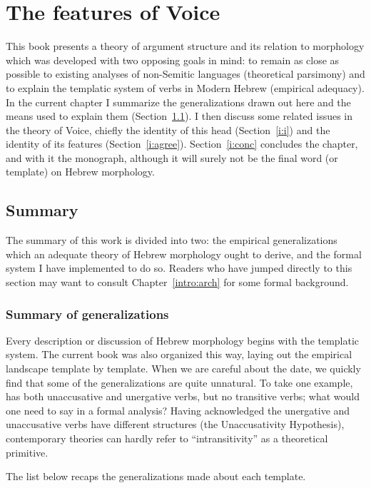 \chapter{The features of Voice}
\label{chap:i}

This book presents a theory of argument structure and its relation to morphology which was developed with two opposing goals in mind: to remain as close as possible to existing analyses of non-Semitic languages (theoretical parsimony) and to explain the templatic system of verbs in Modern Hebrew (empirical adequacy). In the current chapter I summarize the generalizations drawn out here and the means used to explain them (Section~\ref{i:sum}). I then discuss some related issues in the theory of Voice, chiefly the identity of this head (Section~\ref{i:i}) and the identity of its features (Section~\ref{i:agree}). Section~\ref{i:conc} concludes the chapter, and with it the monograph, although it will surely not be the final word (or template) on Hebrew morphology.


\section{Summary} \label{i:sum}
The summary of this work is divided into two: the empirical generalizations which an adequate theory of Hebrew morphology ought to derive, and the formal system I have implemented to do so. Readers who have jumped directly to this section may want to consult Chapter~\ref{intro:arch} for some formal background.

	\subsection{Summary of generalizations}
Every description or discussion of Hebrew morphology begins with the templatic system. The current book was also organized this way, laying out the empirical landscape template by template. When we are careful about the date, we quickly find that some of the generalizations are quite unnatural. To take one example, {\tnif} has both unaccusative and unergative verbs, but no transitive verbs; what would one need to say in a formal analysis? Having acknowledged the unergative and unaccusative verbs have different structures (the Unaccusativity Hypothesis), contemporary theories can hardly refer to ``intransitivity'' as a theoretical primitive.

The list below recaps the generalizations made about each template.

